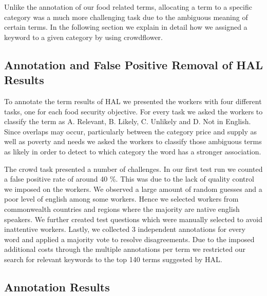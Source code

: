 Unlike the annotation of our food related terms, allocating a term to a specific category was a much more challenging task due to the ambiguous meaning of certain terms. In the following section we explain in detail how we assigned a keyword to a given category by using crowdflower. 




\subsection{Annotation and False Positive Removal of HAL Results}

To annotate the term results of HAL we presented the workers with four different tasks, one for each food security objective. For every task we asked the workers to classify the term as A. Relevant, B. Likely, C. Unlikely and D. Not in English. Since overlaps may occur, particularly between the category price and supply as well as poverty and needs we asked the workers to classify those ambiguous terms  as likely in order to detect to which category the word has a stronger association. 

The crowd task presented a number of challenges. In our first test run we counted a false positive rate of around 40 \%. This was due to the lack of quality control we imposed on the workers. We observed a large amount of random guesses and a poor level of english among some workers. Hence we selected workers from commonwealth countries and regions where the majority are native english speakers. We further created test questions which were manually selected to  avoid inattentive workers. Lastly, we collected 3 independent annotations for every word and applied a majority vote to resolve disagreements. Due to the imposed additional costs through the multiple annotations per term we restricted our search for relevant keywords to the top 140 terms suggested by HAL.


\subsection{Annotation Results}

